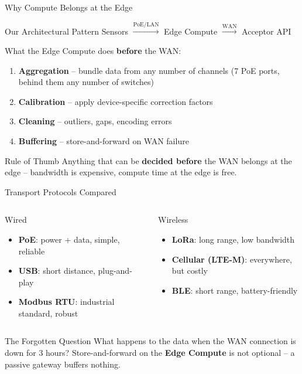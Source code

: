 \documentclass[aspectratio=169]{beamer}
\begin{document}
\begin{frame}{Why Compute Belongs at the Edge}
  \begin{block}{Our Architectural Pattern}
    Sensors $\xrightarrow{\text{PoE/LAN}}$ Edge Compute
    $\xrightarrow{\text{WAN}}$ Acceptor API
  \end{block}
  \vspace{0.5em}
  What the Edge Compute does \textbf{before} the WAN:
  \begin{enumerate}
    \item \textbf{Aggregation} – bundle data from any number of channels
          (7 PoE ports, behind them any number of switches)
    \item \textbf{Calibration} – apply device-specific correction factors
    \item \textbf{Cleaning} – outliers, gaps, encoding errors
    \item \textbf{Buffering} – store-and-forward on WAN failure
  \end{enumerate}
  \vspace{0.5em}
  \begin{alertblock}{Rule of Thumb}
    Anything that can be \textbf{decided before} the WAN belongs at the edge –
    bandwidth is expensive, compute time at the edge is free.
  \end{alertblock}
\end{frame}

\begin{frame}{Transport Protocols Compared}
  \begin{columns}
      \begin{block}{Wired}
        \begin{itemize}
          \item \textbf{PoE}: power + data, simple, reliable
          \item \textbf{USB}: short distance, plug-and-play
          \item \textbf{Modbus RTU}: industrial standard, robust
        \end{itemize}
      \end{block}
      \begin{block}{Wireless}
        \begin{itemize}
          \item \textbf{LoRa}: long range, low bandwidth
          \item \textbf{Cellular (LTE-M)}: everywhere, but costly
          \item \textbf{BLE}: short range, battery-friendly
        \end{itemize}
      \end{block}
  \end{columns}
  \vspace{0.5em}
  \begin{alertblock}{The Forgotten Question}
    What happens to the data when the WAN connection is down for 3 hours?
    Store-and-forward on the \textbf{Edge Compute} is not optional –
    a passive gateway buffers nothing.
  \end{alertblock}
\end{frame}
\end{document}
